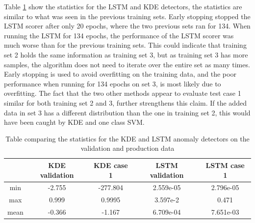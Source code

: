         Table \ref{tab:trainining_plant2_long_stats} show the statistics for the LSTM and KDE detectors, the statistics are similar to what was seen in the previous training sets. Early stopping stopped the LSTM scorer after only 20 epochs, where the two previous sets ran for 134. When running the LSTM for 134 epochs, the performance of the LSTM scorer was much worse than for the previous training sets. This could indicate that training set 2 holds the same information as training set 3, but as training set 3 has more samples, the algorithm does not need to iterate over the entire set as many times. Early stopping is used to avoid overfitting on the training data, and the poor performance when running for 134 epochs on set 3, is most likely due to overfitting. The fact that the two other methods appear to evaluate test case 1 similar for both training set 2 and 3, further strengthens this claim. If the added data in set 3 has a different distribution than the one in training set 2, this would have been caught by KDE and one class SVM.     
        \begin{table}[]
            \centering
            \begin{tabular}{ccccc}
                \hline
                            & \textbf{KDE validation}  & \textbf{KDE case 1}     & \textbf{LSTM validation} & \textbf{LSTM case 1}   \\ \midrule
                min         & -2.755    & -277.804              & 2.559e-05         & 2.796e-05         \\ 
                max         & 0.999     & 0.9995                & 3.597e-2          & 0.471             \\ 
                mean        & -0.366   & -1.167                 & 6.709e-04         & 7.651e-03          \\ \bottomrule
            \end{tabular}
            \caption{Table comparing the statistics for the KDE and LSTM anomaly detectors on the validation and production data}
            \label{tab:trainining_plant2_long_stats}
        \end{table}




